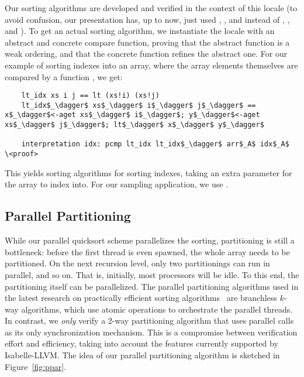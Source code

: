 \documentclass[sn-mathphys,Numbered]{sn-jnl}
\theoremstyle{thmstyleone}%
\theoremstyle{definition}%
\theoremstyle{thmstylethree}%
\begin{document}
  Our sorting algorithms are developed and verified in the context of this locale (to avoid confusion, our presentation has, up to now, just used \is{<}, \is{<=}, and  instead of , , and ).
  To get an actual sorting algorithm, we instantiate the locale with an abstract and concrete compare function, proving
  that the abstract function is a weak ordering, and that the concrete function refines the abstract one.
  For our example of sorting indexes into an array, where the array elements themselves are compared by a function , we get:
  \begin{lstlisting}
    lt_idx xs i j == lt (xs!i) (xs!j)
    lt_idx$_\dagger$ xs$_\dagger$ i$_\dagger$ j$_\dagger$ == x$_\dagger$<-aget xs$_\dagger$ i$_\dagger$; y$_\dagger$<-aget xs$_\dagger$ j$_\dagger$; lt$_\dagger$ x$_\dagger$ y$_\dagger$

    interpretation idx: pcmp lt_idx lt_idx$_\dagger$ arr$_A$ idx$_A$   \<proof>
  \end{lstlisting}
  This yields sorting algorithms for sorting indexes, taking an extra parameter for the array to index into.
  For our sampling application, we use .

  \subsection{Parallel Partitioning}\label{sec:ppar}
  While our parallel quicksort scheme parallelizes the sorting, partitioning is still a bottleneck:
  before the first thread is even spawned, the whole array needs to be partitioned. On the next recursion level,
  only two partitionings can run in parallel, and so on. That is, initially,
  most processors will be idle. To this end, the partitioning itself can be parallelized.
  The parallel partitioning algorithms used in the latest research on practically efficient sorting
  algorithms~\cite{AWFS22} are branchless $k$-way algorithms, which use atomic operations to orchestrate the parallel threads.
  In contrast, we \emph{only} verify a 2-way partitioning algorithm that uses parallel calls as its only synchronization mechanism.
  This is a compromise between verification effort and efficiency, taking into account the features currently supported by Isabelle-LLVM.
  The idea of our parallel partitioning algorithm is sketched in Figure~\ref{fig:ppar}.
\end{document}
